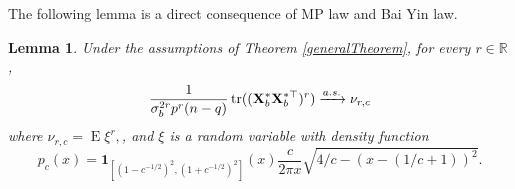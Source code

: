 \documentclass[11pt]{article}
\DeclareMathOperator{\mytr}{tr}
\DeclareMathOperator{\myE}{E}
\theoremstyle{plain}
\newtheorem{lemma}{\quad\quad Lemma}
\theoremstyle{definition}
\theoremstyle{remark}
\begin{document}
\begin{appendices}
The following lemma is a direct consequence of MP law and Bai Yin law.
\begin{lemma}\label{lemma:MP}
    Under the assumptions of Theorem \ref{generalTheorem}, for every $r\in \mathbb R$,
    \begin{equation*}
        \frac{1}{\sigma_b^{2r} p^r (n-q)}\mytr ((\BX_b^* \BX_b^{*\top})^{r} )
        \xrightarrow{a.s.}
        \nu_{r,c}
    \end{equation*}
    where $
        \nu_{r,c}
        =
        \myE \xi^r,
        $, and $\xi$ is a random variable with density function
    \begin{equation*}
        p_{c}(x)=\mathbf{1}_{\left[(1-c^{-1/2})^2,(1+c^{-1/2})^2\right]}(x)
        \frac{c}{2\pi x} \sqrt{4/c - \left(x-(1/c+1)\right)^2}.
    \end{equation*}
\end{lemma}




 



\end{appendices}





\end{document}
